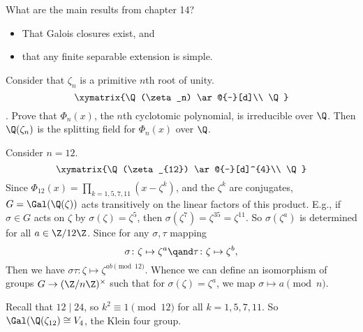 What are the main results from chapter 14? 
\begin{itemize}
    \item That Galois closures exist, and 
    \item that any finite separable extension is simple.
\end{itemize}

\begin{thm}
   Consider that $\zeta_n$ is a primitive $n$th root of unity. 
   \[
       \xymatrix{\Q(\zeta_n) \ar@{-}[d]\\
       \Q}
   \]
   \TODO. Prove that $\Phi_n(x)$, the $n$th cyclotomic polynomial, is irreducible over $\Q$. Then $\Q(\zeta_n)$ is the splitting field for $\Phi_n(x)$ over $\Q$.
\end{thm}

\begin{ex}
    Consider $n = 12$.
   \[
       \xymatrix{\Q(\zeta_{12}) \ar@{-}[d]^{4}\\
       \Q}
   \]
   Since $\Phi_{12}(x) = \prod_{k = 1, 5, 7, 11} (x - \zeta^k)$, and the $\zeta^k$ are conjugates, $G = \Gal(\Q(\zeta))$ acts transitively on the linear factors of this product. E.g., if $\sigma \in G$ acts on $\zeta$ by $\sigma(\zeta) = \zeta^5$, then $\sigma(\zeta^7) = \zeta^{35} = \zeta^{11}$. So $\sigma(\zeta^a)$ is determined for all $a \in \Z/12\Z$. Since for any $\sigma, \tau$ mapping 
   \[
       \sigma \colon \zeta \mapsto \zeta^a \qand 
       \tau \colon \zeta \mapsto \zeta^b,
   \]
   Then we have $\sigma\tau \colon \zeta \mapsto \zeta^{ab \pmod{12}}$. Whence we can define an isomorphism of groups $G \to (\Z/n \Z)^\times$ such that for $\sigma(\zeta) = \zeta^a$, we map $\sigma \mapsto a \pmod{n}$.
\end{ex}

\begin{note}[]
    Recall that $12 \mid 24$, so $k^2 \equiv 1 \pmod{12}$ for all $k = 1, 5, 7, 11$. So $\Gal(\Q(\zeta_{12}) \cong V_4$, the Klein four group.
\end{note}

